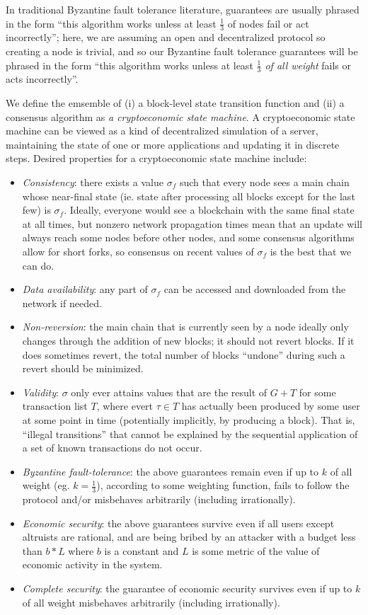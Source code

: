 \documentclass[11pt,a4paper]{article}
\theoremstyle{plain}
\theoremstyle{definition}
\theoremstyle{remark}
\begin{document}
In traditional Byzantine fault tolerance literature, guarantees are usually phrased in the form ``this algorithm works unless at least $\frac{1}{3}$ of nodes fail or act incorrectly''; here, we are assuming an open and decentralized protocol so creating a node is trivial, and so our Byzantine fault tolerance guarantees will be phrased in the form ``this algorithm works unless at least \emph{$\frac{1}{3}$ of all weight} fails or acts incorrectly''.

We define the emsemble of (i) a block-level state transition function and (ii) a consensus algorithm as \emph{a cryptoeconomic state machine}. A cryptoeconomic state machine can be viewed as a kind of decentralized simulation of a server, maintaining the state of one or more applications and updating it in discrete steps. Desired properties for a cryptoeconomic state machine include:

\begin{itemize}
\item
\emph{Consistency}: there exists a value $\sigma_f$ such that every node sees a main chain whose near-final state (ie. state after processing all blocks except for the last few) is $\sigma_f$. Ideally, everyone would see a blockchain with the same final state at all times, but nonzero network propagation times mean that an update will always reach some nodes before other nodes, and some consensus algorithms allow for short forks, so consensus on recent values of $\sigma_f$ is the best that we can do.
\item
\emph{Data availability}: any part of $\sigma_f$ can be accessed and downloaded from the network if needed.
\item
\emph{Non-reversion}: the main chain that is currently seen by a node ideally only changes through the addition of new blocks; it should not revert blocks. If it does sometimes revert, the total number of blocks  ``undone'' during such a revert should be minimized.
\item
\emph{Validity}: $\sigma$ only ever attains values that are the result of $G + T$ for some transaction list $T$, where evert $\tau \in T$ has actually been produced by some user at some point in time (potentially implicitly, by producing a block). That is, ``illegal transitions'' that cannot be explained by the sequential application of a set of known transactions do not occur.
\item
\emph{Byzantine fault-tolerance}: the above guarantees remain even if up to $k$ of all weight (eg. $k = \frac{1}{3}$), according to some weighting function, fails to follow the protocol and/or misbehaves arbitrarily (including irrationally).
\item
\emph{Economic security}: the above guarantees survive even if all users except altruists are rational, and are being bribed by an attacker with a budget less than $b * L$ where $b$ is a constant and $L$ is some metric of the value of economic activity in the system.
\item
\emph{Complete security}: the guarantee of economic security survives even if up to $k$ of all weight misbehaves arbitrarily (including irrationally).
\end{itemize}
\end{document}
